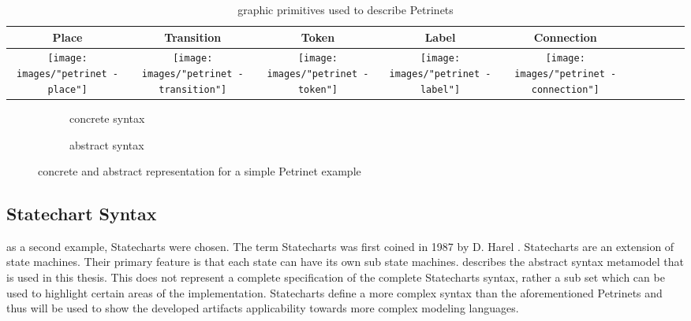 \begin{table}[ht]
  \centering
\begin{tabular}[width=.1\linewidth]{| Sc | Sc | Sc | Sc | Sc |}
  \hline
  Place & Transition & Token & Label & Connection 
  \\
  \hline
  \texttt{[image: images/"petrinet - place"]} 
  & 
  \texttt{[image: images/"petrinet - transition"]} 
  & 
  \texttt{[image: images/"petrinet - token"]}
  & 
  \texttt{[image: images/"petrinet - label"]}
  & 
  \texttt{[image: images/"petrinet - connection"]} 
  \\
  \hline
\end{tabular}
\caption{graphic primitives used to describe Petrinets}
\label{tab:petri-primitives}
\end{table}

\begin{figure}[ht!]
  \centering
  \begin{subfigure}[t]{.3\textwidth}
    \centering
    
    \caption{concrete syntax}
    \label{subfig:petriconcrete}    
  \end{subfigure}
  \begin{subfigure}[t]{.35\textwidth}
    \centering
    
    \caption{abstract syntax}
    \label{subfig:petriabstract}    
  \end{subfigure}
  \caption{concrete and abstract representation for a simple Petrinet example}
  \label{fig:petrinets_example}
\end{figure} 

\subsection{Statechart Syntax}
\label{sec:statecharts}
as a second example, Statecharts were chosen. The term Statecharts was first coined in 1987 by D. Harel \cite{harel_statecharts_1987}. Statecharts are an extension of state machines. Their primary feature is that each state can have its own sub state machines.  describes the abstract syntax metamodel that is used in this thesis. This does not represent a complete specification of the complete Statecharts syntax, rather a sub set which can be used to highlight certain areas of the implementation. Statecharts define a more complex syntax than the aforementioned Petrinets and thus will be used to show the developed artifacts applicability towards more complex modeling languages.

